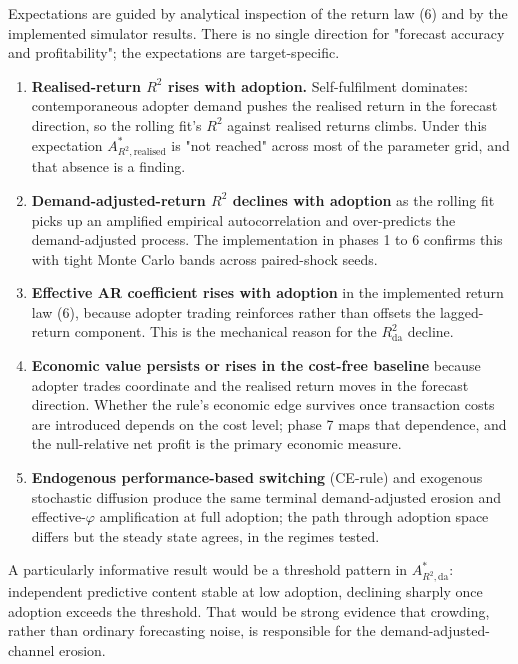 \documentclass[11pt]{article}
\begin{document}
Expectations are guided by analytical inspection of the return law (6) and by the implemented simulator results. There is no single direction for "forecast accuracy and profitability"; the expectations are target-specific.

\begin{enumerate}[itemsep=0.2em]
  \item \textbf{Realised-return $R^{2}$ rises with adoption.} Self-fulfilment dominates: contemporaneous adopter demand pushes the realised return in the forecast direction, so the rolling fit's $R^{2}$ against realised returns climbs. Under this expectation $A^{*}_{R^{2},\mathrm{realised}}$ is "not reached" across most of the parameter grid, and that absence is a finding.
  \item \textbf{Demand-adjusted-return $R^{2}$ declines with adoption} as the rolling fit picks up an amplified empirical autocorrelation and over-predicts the demand-adjusted process. The implementation in phases 1 to 6 confirms this with tight Monte Carlo bands across paired-shock seeds.
  \item \textbf{Effective AR coefficient rises with adoption} in the implemented return law (6), because adopter trading reinforces rather than offsets the lagged-return component. This is the mechanical reason for the $R^{2}_{\mathrm{da}}$ decline.
  \item \textbf{Economic value persists or rises in the cost-free baseline} because adopter trades coordinate and the realised return moves in the forecast direction. Whether the rule's economic edge survives once transaction costs are introduced depends on the cost level; phase 7 maps that dependence, and the null-relative net profit is the primary economic measure.
  \item \textbf{Endogenous performance-based switching} (CE-rule) and exogenous stochastic diffusion produce the same terminal demand-adjusted erosion and effective-$\varphi$ amplification at full adoption; the path through adoption space differs but the steady state agrees, in the regimes tested.
\end{enumerate}

A particularly informative result would be a threshold pattern in $A^{*}_{R^{2},\mathrm{da}}$: independent predictive content stable at low adoption, declining sharply once adoption exceeds the threshold. That would be strong evidence that crowding, rather than ordinary forecasting noise, is responsible for the demand-adjusted-channel erosion.
\end{document}
